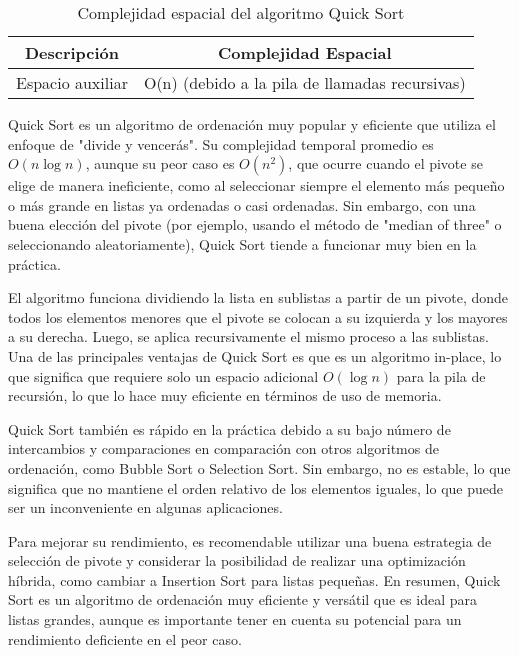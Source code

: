 \begin{table}[h]
    \centering
    \begin{tabular}{|c|c|}
        \hline
        \textbf{Descripción} & \textbf{Complejidad Espacial} \\
        \hline
        Espacio auxiliar & O(n) (debido a la pila de llamadas recursivas) \\
        \hline
    \end{tabular}
    \caption{Complejidad espacial del algoritmo Quick Sort}
    \label{tab:complejidad_espacial}
\end{table}

Quick Sort es un algoritmo de ordenación muy popular y eficiente que utiliza el enfoque de "divide y vencerás". Su complejidad temporal promedio es \(O(n \log n)\), aunque su peor caso es \(O(n^2)\), que ocurre cuando el pivote se elige de manera ineficiente, como al seleccionar siempre el elemento más pequeño o más grande en listas ya ordenadas o casi ordenadas. Sin embargo, con una buena elección del pivote (por ejemplo, usando el método de "median of three" o seleccionando aleatoriamente), Quick Sort tiende a funcionar muy bien en la práctica.

El algoritmo funciona dividiendo la lista en sublistas a partir de un pivote, donde todos los elementos menores que el pivote se colocan a su izquierda y los mayores a su derecha. Luego, se aplica recursivamente el mismo proceso a las sublistas. Una de las principales ventajas de Quick Sort es que es un algoritmo in-place, lo que significa que requiere solo un espacio adicional \(O(\log n)\) para la pila de recursión, lo que lo hace muy eficiente en términos de uso de memoria.

Quick Sort también es rápido en la práctica debido a su bajo número de intercambios y comparaciones en comparación con otros algoritmos de ordenación, como Bubble Sort o Selection Sort. Sin embargo, no es estable, lo que significa que no mantiene el orden relativo de los elementos iguales, lo que puede ser un inconveniente en algunas aplicaciones.

Para mejorar su rendimiento, es recomendable utilizar una buena estrategia de selección de pivote y considerar la posibilidad de realizar una optimización híbrida, como cambiar a Insertion Sort para listas pequeñas. En resumen, Quick Sort es un algoritmo de ordenación muy eficiente y versátil que es ideal para listas grandes, aunque es importante tener en cuenta su potencial para un rendimiento deficiente en el peor caso.